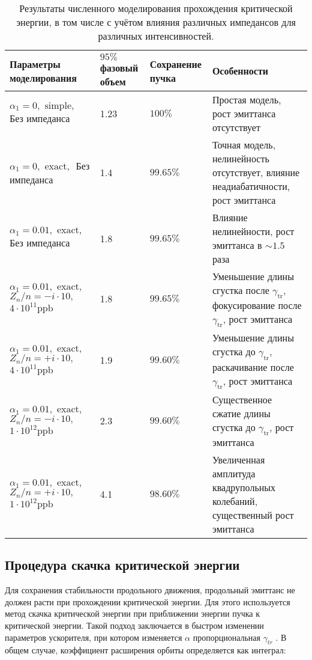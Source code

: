 \begin{table}
\begin{center}
\begin{tabular}{| m{4cm} | M{2.5cm} | M{2.5cm} | m{6.6cm} |}
\hline 
Параметры моделирования & $95 \%$ фазовый объем & Сохранение пучка & Особенности \\
\hline
$\alpha_1=0, \text { simple, }$ Без импеданса & 1.23 & $100\%$ & Простая модель, рост эмиттанса отсутствует \\
\hline 
$\alpha_1=0, \text { exact, }$ Без импеданса & 1.4 & $99.65\%$ & Точная модель, нелинейность отсутствует, влияние неадиабатичности, рост эмиттанса \\
\hline 
$\alpha_1=0.01, \text { exact, }$ Без импеданса & 1.8 & $99.65\%$ & Влияние нелинейности, рост эмиттанса в $\sim 1.5$ раза \\
\hline 
$
 \alpha_1=0.01, \text { exact, }$
$ Z_n / n=-i \cdot 10, \quad$
$4 \cdot 10^{11} \mathrm{ppb} $
 & 1.8 & $99.65\%$ & Уменьшение длины сгустка после $\gamma_{\mathrm{tr}}$, фокусирование после $\gamma_{\mathrm{tr}}$, рост эмиттанса \\
\hline 
$
\alpha_1=0.01, \text { exact, }$ 
$ Z_n / n=+i \cdot 10, \quad$
$4 \cdot 10^{11} \mathrm{ppb} $
 & 1.9 & $99.60\%$ & Уменьшение длины сгустка до $\gamma_{\mathrm{tr}}$, раскачивание после $\gamma_{\mathrm{tr}}$, рост эмиттанса \\
\hline 
$
\alpha_1=0.01, \text { exact, } $ 
$Z_n / n=-i \cdot 10, \quad$
$1 \cdot 10^{12} \mathrm{ppb}$
 & 2.3 & $99.60\%$ & Существенное сжатие длины сгустка до $\gamma_{\mathrm{tr}}$, рост эмиттанса \\
\hline 
$
 \alpha_1=0.01, \text { exact, } $ 
$ Z_n / n=+i \cdot 10, \quad$
$ 1 \cdot 10^{12} \mathrm{ppb}$
 & 4.1 & $98.60\%$ & Увеличенная амплитуда квадрупольных колебаний, существенный рост эмиттанса \\
\hline
\end{tabular}
\end{center}
\caption{Результаты численного моделирования прохождения критической энергии, в том числе с учётом влияния различных импедансов для различных интенсивностей.}
\label{tbl:u-70_crossing}
\end{table}

\subsection{Процедура скачка критической энергии}

\par Для сохранения стабильности продольного движения, продольный эмиттанс не должен расти при прохождении критической энергии. Для этого используется метод скачка критической энергии при приближении энергии пучка к критической энергии. Такой подход заключается в быстром изменении параметров ускорителя, при котором изменяется $\alpha$ пропорциональная $\gamma_{tr}$ . В общем случае, коэффициент расширения орбиты определяется как интеграл:

